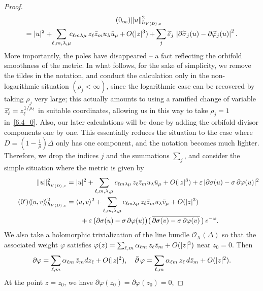 \documentclass[10pt,a4paper]{article}
\DeclareMathOperator{\dbar}{\bar\partial}
\DeclarePairedDelimiter{\abs}{\lvert}{\rvert}
\DeclarePairedDelimiter{\Abs}{\lVert}{\rVert}
\newcommand*\cO{\mathcal{O}}
\let\oldtilde\tilde
\renewcommand*{\tilde}[1]{\mathchoice{\widetilde{#1}}{\widetilde{#1}}{\oldtilde{#1}}{\oldtilde{#1}}}
\numberwithin{equation}{section}
\begin{document}
\begin{proof}
\begin{multline}
\tag{$\theequation_{\infty}$}
\Abs{u}_{h_{V\langle D\rangle,\varepsilon}}^2 \\
=
\abs{u}^2+{}\kern-4pt
\sum_{\ell,m,\lambda,\mu}\kern-4pt c_{\ell m\lambda\mu}\,z_\ell\bar z_m u_\lambda\bar u_\mu\,{+}\,O(\abs{z}^3)
\,{+}\sum_j\tilde\varepsilon_j\,
\left|\partial\tilde\sigma_j(u)-\partial\tilde\varphi_j(u)\right|^2.
\end{multline}
More importantly, the poles have disappeared -- a fact reflecting the orbifold smoothness of the metric. In what follows, for the sake of simplicity, we remove the tildes in the notation, and conduct the calculation only in the non-logarithmic situation $(\rho_j<\infty)$, since the logarithmic case can be recovered by taking $\rho_j$ very large; this actually amounts to using a ramified change of variable $\tilde z'_\ell=\smash{z_\ell^{1/\rho_\ell}}$ in suitable coordinates, allowing us in this way to take $\rho_j=1$ in~\eqref{6.4_0}. Also, our later calculations will be done by adding the orbifold divisor components one by one. This essentially reduces the situation to the case where $D=(1-\tfrac{1}{\rho})\Delta$ only has one component, and the notation becomes much lighter. Therefore, we drop the indices $j$ and the summations $\sum_j$, and consider the simple situation where the metric is given by
\begin{align}\label{6.8}
\Abs{u}_{h_{V\langle D\rangle,\varepsilon}}^2 &=
\abs{u}^2+\sum_{\ell,m,\lambda,\mu}c_{\ell m\lambda\mu}\,z_\ell\bar z_m u_\lambda\bar u_\mu+O(\abs{z}^3)+\varepsilon\,|\partial\sigma(u) -\sigma\,\partial\varphi(u)|^2
\\
\tag{\theequation\ensuremath{'}}\label{6.8'}
\langle\!\langle u,v\rangle\!\rangle_{h_{V\langle D\rangle,\varepsilon}}^2 &=
\langle u,v\rangle^2+
\sum_{\ell,m,\lambda,\mu}c_{\ell m\lambda\mu}\,z_\ell\bar z_m u_\lambda\bar v_\mu+O(\abs{z}^3)
\\
\nonumber&
\qquad+\varepsilon\,\big(\partial\sigma(u)-\sigma\,\partial\varphi(u)\big)
\big(\,\overline{\partial\sigma(v)-\sigma\,\partial\varphi(v)}\,\big)
\,e^{-\varphi}.
\end{align}
We also take a holomorphic trivialization of the line bundle $\cO_X(\Delta)$ so that the associated weight $\varphi$ satisfies
$\varphi(z)=\sum_{\ell,m}\alpha_{\ell m}\,z_\ell\bar z_m+O(\abs{z}^3)$ near
$z_0=0$. Then
\[
\partial\varphi=\sum_{\ell,m}\alpha_{\ell m}\,\bar z_m dz_\ell+O(\abs{z}^2),
\quad
\dbar\varphi=\sum_{\ell,m}\alpha_{\ell m}\,z_\ell\,d\bar z_m+O(\abs{z}^2).
\]
At the point $z=z_0$, we have $\partial\varphi(z_0)=\partial\varphi(z_0)=0$,

\end{proof}
\end{document}
